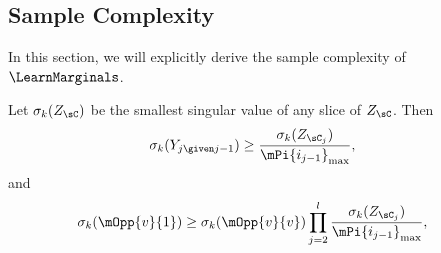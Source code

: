 
\subsection{Sample Complexity}

In this section, we will explicitly derive the sample complexity of
  $\LearnMarginals$.

Let $\sigma_k(Z_\sC)$ be the smallest singular value of any slice of $Z_\sC$. Then 
\begin{align*}
  \sigma_k(Y_{j \given j-1}) &\ge \frac{\sigma_k(Z_{\sC_j})}{\mPi{i_{j-1}}_{\max}},
\end{align*}
and 
\begin{align*}
  \sigma_k(\mOpp{v}{1}) &\ge \sigma_k(\mOpp{v}{v}) \prod_{j=2}^{l} \frac{\sigma_k(Z_{\sC_j})}{\mPi{i_{j-1}}_{\max}},
\end{align*}



